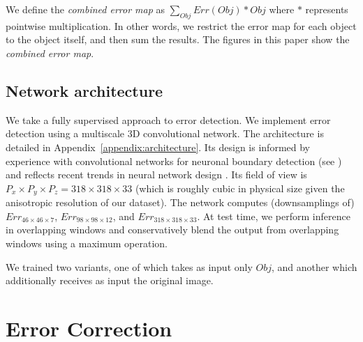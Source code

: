 \documentclass{article}
\begin{document}
We define the \textit{combined error map} as $\sum_{Obj} Err(Obj) * Obj$ where $*$ represents pointwise multiplication. In other words, we restrict the error map for each object to the object itself, and then sum the results. The figures in this paper show the \textit{combined error map}.

\subsection{Network architecture}
We take a fully supervised approach to error detection. We implement error detection using a multiscale 3D convolutional network. The architecture is detailed in Appendix~\ref{appendix:architecture}. Its design is informed by experience with convolutional networks for neuronal boundary detection (see \cite{kisuk}) and reflects recent trends in neural network design \cite{unet,resnet}. Its field of view is $P_x\times P_y\times P_z=318\times 318\times 33$ (which is roughly cubic in physical size given the anisotropic resolution of our dataset). The network computes (downsamplings of) $Err_{46 \times 46 \times 7}$, $Err_{98 \times 98 \times 12}$, and $Err_{318 \times 318 \times 33}$. At test time, we perform inference in overlapping windows and conservatively blend the output from overlapping windows using a maximum operation.

We trained two variants, one of which takes as input only $Obj$, and another which additionally receives as input the original image.

\section{Error Correction}
\end{document}
